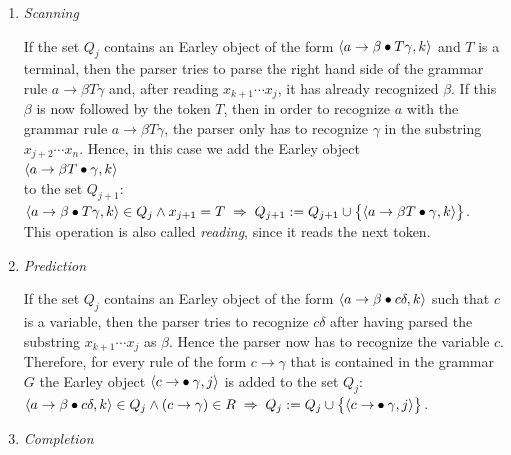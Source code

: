 \begin{enumerate}
\item \emph{Scanning}

      If the set $Q_j$ contains an Earley object of the form 
      $\pair(a \rightarrow \beta \mdot T \gamma, k)$ and $T$ is a 
      terminal, then the parser tries to parse the right hand side of the grammar rule
      $a \rightarrow \beta T \gamma$ and, after reading $x_{k+1} \cdots x_j$, it has already recognized $\beta$.
      If this $\beta$ is now followed by the token $T$, then in order to recognize $a$ with the grammar rule
      $a \rightarrow \beta T \gamma$, the parser only has to recognize $\gamma$ in the substring
      $x_{j+2} \cdots x_n$.  Hence, in this case we add the Earley object
      \\[0.2cm]
      \hspace*{1.3cm}
      $\pair(a \rightarrow \beta T \mdot \gamma, k)$
      \\[0.2cm]
      to the set $Q_{j+1}$:
      \\[0.2cm]
      \hspace*{1.3cm}
      $\pair(a \rightarrow \beta \mdot T \gamma, k) \in Q_j \wedge x_{j+1} = T
       \;\Rightarrow\;
       Q_{j+1} := Q_{j+1} \cup \bigl\{ \pair(a \rightarrow \beta T \mdot \gamma, k) \bigr\}$.
      \\[0.2cm]
      This operation is also called \emph{reading}, since it reads the next token.
\item \emph{Prediction}

      If the set $Q_j$ contains an Earley object of the form $\pair(a \rightarrow \beta \mdot c \delta, k)$
      such that $c$ is a variable, then the parser tries to recognize $c\delta$ after having
      parsed the substring $x_{k+1} \cdots x_j$ as $\beta$.  Hence the parser now has to recognize the variable
      $c$.  Therefore, for every rule of the form $c \rightarrow \gamma$ that is contained in the grammar $G$
      the Earley object 
      $\pair(c \rightarrow \mdot \gamma, j)$ is added to the set $Q_j$:
      \\[0.2cm]
      \hspace*{1.3cm}
      $\pair(a \rightarrow \beta \mdot c \delta, k) \in Q_j 
       \wedge (c \rightarrow \gamma) \in R 
       \;\Rightarrow\;
       Q_j := Q_j \cup\bigl\{ \pair(c \rightarrow \mdot\gamma, j)\bigr\}$.
\item \emph{Completion}


\end{enumerate}
